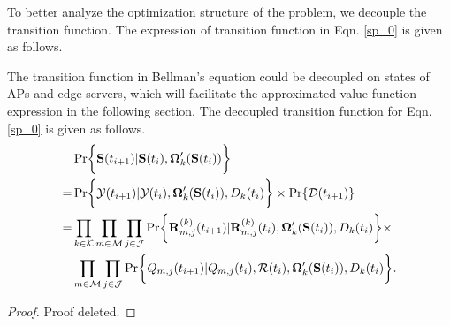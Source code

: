 To better analyze the optimization structure of the problem, we decouple the transition function. The expression of transition function in Eqn. \ref{sp_0} is given as follows.
\begin{lemma}
    The transition function in Bellman's equation could be decoupled on states of APs and edge servers, which will facilitate the approximated value function expression in the following section.
    The decoupled transition function for Eqn. \ref{sp_0} is given as follows.
    \begin{align}
        & \Pr\Brace{ \Stat(t_{i+1})|\Stat(t_{i}), \Policy'_{k}(\Stat(t_{i})) }
        \nonumber\\
        =& \Pr\Brace{ \Obsv(t_{i+1})|\Obsv(t_{i}), \Policy'_{k}(\Stat(t_{i})), D_{k}(t_{i}) } \times \Pr\{\mathcal{D}(t_{i+1})\}
        \nonumber\\
        =& \prod_{k\in\apSet}\prod_{m\in\esSet}\prod_{j\in\jSpace}
                \Pr\Brace{
                    \vec{R}^{(k)}_{m,j}(t_{i+1}) | \vec{R}^{(k)}_{m,j}(t_{i}),
                    \Policy'_{k}(\Stat(t_{i})), D_{k}(t_{i})
                }
                \times  
            \nonumber\\
            & \prod_{m\in\esSet}\prod_{j\in\jSpace}
                \Pr\Brace{
                    Q_{m,j}(t_{i+1})|Q_{m,j}(t_{i}), \mathcal{R}(t_{i}), \Policy'_{k}(\Stat(t_{i})), D_{k}(t_{i})
                }.
    \end{align}
\end{lemma}
\begin{proof}
    Proof deleted.
\end{proof}

